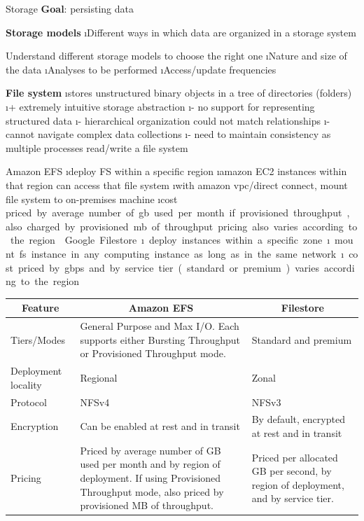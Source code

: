 \begin{frame}[allowframebreaks]{Storage}
\textbf{Goal}: persisting data

\textbf{Storage models}
\i Different ways in which data are organized in a storage system

Understand different storage models to choose the right one
\i Nature and size of the data
\i Analyses to be performed
\i Access/update frequencies

\framebreak


\textbf{File system} 
\i stores unstructured binary objects in a tree of directories (folders)
\i + extremely intuitive storage abstraction
\i - no support for representing structured data
\i - hierarchical organization could not match relationships
\i - cannot navigate complex data collections
\i - need to maintain consistency as multiple processes read/write a file system

\framebreak
Amazon EFS
\i deploy FS within a specific region
\i amazon EC2 instances within that region can access that file system
\i with amazon vpc/direct connect, mount file system to on-premises machine
\i cost
\si priced by average number of gb used per month
\si if provisioned throughput, also charged by provisioned mb of throughput
\si pricing also varies according to the region

\framebreak
Google Filestore
\i deploy instances within a specific zone
\i mount fs instance in any computing instance as long as in the same network
\i cost
\si priced by gbps and by service tier (standard or premium)
\si varies according to the region

\framebreak
\begin{table}
\centering
\footnotesize
\begin{tabular}{lp{5cm}p{5cm}}
    \multicolumn{1}{c}{\textbf{Feature}} & \multicolumn{1}{c}{\textbf{Amazon EFS}} & \multicolumn{1}{c}{\textbf{Filestore}} \\
    \midrule
    Tiers/Modes & General Purpose and Max I/O. Each supports either Bursting Throughput or Provisioned Throughput mode. & Standard and premium \\
    Deployment locality & Regional & Zonal \\
    Protocol & NFSv4 & NFSv3 \\
    Encryption & Can be enabled at rest and in transit & By default, encrypted at rest and in transit \\
    Pricing & Priced by average number of GB used per month and by region of deployment. If using Provisioned Throughput mode, also priced by provisioned MB of throughput. & Priced per allocated GB per second, by region of deployment, and by service tier. \\
\end{tabular}%
\end{table}%


\end{frame}
